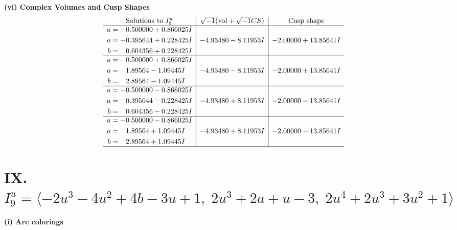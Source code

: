 \documentclass[1p]{elsarticle_modified}
\theoremstyle{definition}
\newcommand{\I}{\sqrt{-1}}
\begin{document}
\newpage\flushleft \textbf{(vi) Complex Volumes and Cusp Shapes}
$$\begin{array}{c|c|c}  
\text{Solutions to }I^u_{8}& \I (\text{vol} + \sqrt{-1}CS) & \text{Cusp shape}\\
 \hline 
\begin{aligned}
u &= -0.500000 + 0.866025 I \\
a &= -0.395644 + 0.228425 I \\
b &= \phantom{-}0.604356 + 0.228425 I\end{aligned}
 & -4.93480 - 8.11953 I & -2.00000 + 13.85641 I \\ \hline\begin{aligned}
u &= -0.500000 + 0.866025 I \\
a &= \phantom{-}1.89564 - 1.09445 I \\
b &= \phantom{-}2.89564 - 1.09445 I\end{aligned}
 & -4.93480 - 8.11953 I & -2.00000 + 13.85641 I \\ \hline\begin{aligned}
u &= -0.500000 - 0.866025 I \\
a &= -0.395644 - 0.228425 I \\
b &= \phantom{-}0.604356 - 0.228425 I\end{aligned}
 & -4.93480 + 8.11953 I & -2.00000 - 13.85641 I \\ \hline\begin{aligned}
u &= -0.500000 - 0.866025 I \\
a &= \phantom{-}1.89564 + 1.09445 I \\
b &= \phantom{-}2.89564 + 1.09445 I\end{aligned}
 & -4.93480 + 8.11953 I & -2.00000 - 13.85641 I\\
 \hline 
 \end{array}$$\newpage\newpage\renewcommand{\arraystretch}{1}
\centering \section*{IX. $I^u_{9}= \langle -2 u^3-4 u^2+4 b-3 u+1,\;2 u^3+2 a+u-3,\;2 u^4+2 u^3+3 u^2+1 \rangle$}
\flushleft \textbf{(i) Arc colorings}\\
\end{document}
